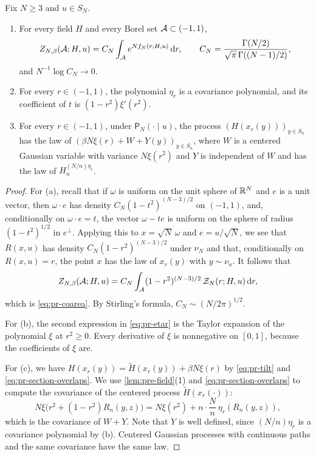 \begin{lemma}\label{lem:pr-section}
Fix $N\ge3$ and $u\in S_N$.
\begin{enumerate}
\item[(a)] For every field $H$ and every Borel set $\mathcal A\subset(-1,1)$,
\begin{equation}\label{eq:pr-coarea}
Z_{N,\beta}(\mathcal A;H,u)=C_N\int_{\mathcal A}e^{Nf_N(r;H,u)}\,\mathrm d r,\qquad C_N=\frac{\Gamma(N/2)}{\sqrt\pi\,\Gamma((N-1)/2)},
\end{equation}
and $N^{-1}\log C_N\to0$.
\item[(b)] For every $r\in(-1,1)$, the polynomial $\eta_r$ is a covariance polynomial, and its coefficient of $t$ is $(1-r^2)\xi'(r^2)$.
\item[(c)] For every $r\in(-1,1)$, under $\mathsf P_N(\cdot\mid u)$, the process $(H(x_r(y)))_{y\in S_n}$ has the law of $(\beta N\xi(r)+W+Y(y))_{y\in S_n}$, where $W$ is a centered Gaussian variable with variance $N\xi(r^2)$ and $Y$ is independent of $W$ and has the law of $H_n^{(N/n)\eta_r}$.
\end{enumerate}
\end{lemma}

\begin{proof}
For (a), recall that if $\omega$ is uniform on the unit sphere of $\mathbb R^N$ and $e$ is a unit vector, then $\omega\cdot e$ has density $C_N(1-t^2)^{(N-3)/2}$ on $(-1,1)$, and, conditionally on $\omega\cdot e=t$, the vector $\omega-te$ is uniform on the sphere of radius $(1-t^2)^{1/2}$ in $e^\perp$. Applying this to $x=\sqrt N\,\omega$ and $e=u/\sqrt N$, we see that $R(x,u)$ has density $C_N(1-r^2)^{(N-3)/2}$ under $\nu_N$ and that, conditionally on $R(x,u)=r$, the point $x$ has the law of $x_r(y)$ with $y\sim\nu_n$. It follows that
\[
Z_{N,\beta}(\mathcal A;H,u)=C_N\int_{\mathcal A}(1-r^2)^{(N-3)/2}\,\mathcal Z_N(r;H,u)\,\mathrm d r,
\]
which is \eqref{eq:pr-coarea}. By Stirling's formula, $C_N\sim(N/2\pi)^{1/2}$.

For (b), the second expression in \eqref{eq:pr-etar} is the Taylor expansion of the polynomial $\xi$ at $r^2\ge0$. Every derivative of $\xi$ is nonnegative on $[0,1]$, because the coefficients of $\xi$ are.

For (c), we have $H(x_r(y))=\widetilde H(x_r(y))+\beta N\xi(r)$ by \eqref{eq:pr-tilt} and \eqref{eq:pr-section-overlaps}. We use \cref{lem:pre-field}(1) and \eqref{eq:pr-section-overlaps} to compute the covariance of the centered process $\widetilde H(x_r(\cdot))$:
\[
N\xi\bigl(r^2+(1-r^2)R_n(y,z)\bigr)=N\xi(r^2)+n\cdot\frac Nn\,\eta_r(R_n(y,z)),
\]
which is the covariance of $W+Y$. Note that $Y$ is well defined, since $(N/n)\eta_r$ is a covariance polynomial by (b). Centered Gaussian processes with continuous paths and the same covariance have the same law.
\end{proof}

